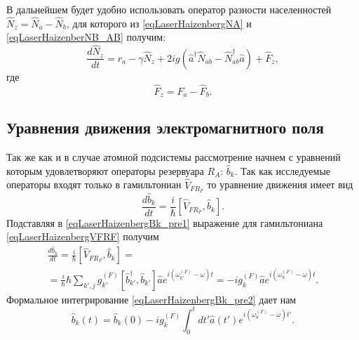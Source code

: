 В дальнейшем будет удобно использовать оператор разности населенностей
$\hat{N}_z = \hat{N}_a - \hat{N}_b$, для которого из
\eqref{eqLaserHaizenbergNA} и 
\eqref{eqLaserHaizenberNB_AB} получим:
\begin{equation}
\frac{d \hat{N}_z}{d t} = r_a
- \gamma \hat{N}_{z} +
2 i g 
 \left(
\hat{a}^{\dag}\hat{N}_{ab} -
\hat{N}_{ab}^{\dag}\hat{a}
\right) + \hat{F}_{z},
\label{eqLaserHaizenberNZ}
\end{equation}
где
\begin{equation}
\hat{F}_{z} = \hat{F}_{a} - \hat{F}_{b}.
\label{eqLaserHaizenberFZ}
\end{equation}

\subsection{Уравнения движения электромагнитного поля}

Так же как и в случае атомной подсистемы рассмотрение начнем с
уравнений которым удовлетворяют операторы резервуара $R_A$:
$\hat{b}_k$. Так как исследуемые операторы входят только в
гамильтониан $\hat{V}_{FR_F}$ то уравнение движения имеет вид
\begin{equation}
\frac{d \hat{b}_k}{d t} = \frac{i}{\hbar}\left[\hat{V}_{FR_F}, \hat{b}_k
\right].
\label{eqLaserHaizenbergBk_pre1}
\end{equation}
Подставляя в \eqref{eqLaserHaizenbergBk_pre1} выражение для
гамильтониана \eqref{eqLaserHaizenbergVFRF} получим
\begin{eqnarray}
\frac{d \hat{b}_k}{d t} = \frac{i}{\hbar}\left[\hat{V}_{FR_F}, \hat{b}_k
\right] = 
\nonumber \\
= \frac{i}{\hbar} \hbar 
\sum_{k',j} 
g_{k'}^{(F)}\left[\hat{b}_{k'}^{\dag},
  \hat{b}_{k'}\right]\hat{a}e^{i\left(\omega_{k'}^{(F)} - \omega\right)t} = 
-i g_{k}^{(F)}\hat{a}e^{i\left(\omega_{k}^{(F)} - \omega\right)t}.
\label{eqLaserHaizenbergBk_pre2}
\end{eqnarray}
Формальное интегрирование \eqref{eqLaserHaizenbergBk_pre2} дает нам
\begin{equation}
\hat{b}_k\left(t\right) = 
\hat{b}_k\left(0\right) 
-i g_{k}^{(F)}\int_0^t d
t'\hat{a}\left(t'\right)e^{i\left(\omega_{k}^{(F)} - \omega\right)t'}.
\label{eqLaserHaizenbergBk}
\end{equation}

